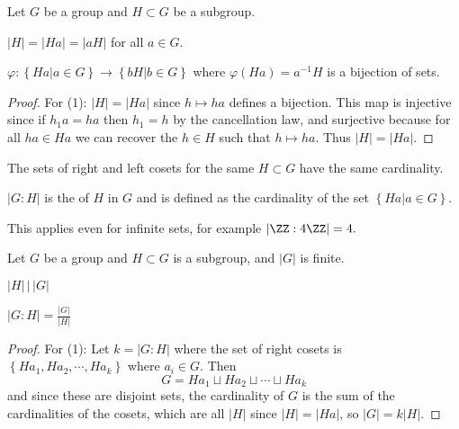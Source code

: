 \documentclass{article}
\begin{document}
\begin{lemma}
	Let $G$ be a group and $H\subset G$ be a subgroup.

	\begin{enumerate}[(1)]
		\ii $|H|=|Ha|=|aH|$ for all $a\in G.$

		\ii $\varphi:\left\{ Ha|a\in G \right\} \to \left\{ bH|b\in G \right\}$ where $\varphi(Ha)=a^{-1}H$ is a bijection of sets.
	\end{enumerate}
\end{lemma}

\begin{proof}
	For (1): $|H|=|Ha|$ since $h\mapsto ha$ defines a bijection. This map is injective since if $h_1a=ha$ then $h_1=h$ by the cancellation law, and surjective because for all $ha\in Ha$ we can recover the $h\in H$ such that $h\mapsto ha.$ Thus $|H|=|Ha|.$
\end{proof}

\begin{remark}
	The sets of right and left cosets for the same $H\subset G$ have the same cardinality.
\end{remark}

\begin{definition}
	$|G:H|$ is the  of $H$ in $G$ and is defined as the cardinality of the set $\left\{ Ha|a\in G \right\}.$
\end{definition}

\begin{remark}
	This applies even for infinite sets, for example $|\ZZ:4\ZZ|=4.$
\end{remark}

\begin{theorem}
	Let $G$ be a group and $H\subset G$ is a subgroup, and $|G|$ is finite.

	\begin{enumerate}[(1)]
		\ii $|H| \, \big\vert\, |G|$

		\ii $|G:H|=\displaystyle\frac{|G|}{|H|}$
	\end{enumerate}
\end{theorem}

\begin{proof}
	For (1): Let $k=|G:H|$ where the set of right cosets is $\left\{ Ha_1, Ha_2, \cdots, Ha_k \right\}$ where $a_i\in G.$ Then \[G=Ha_1\sqcup Ha_2\sqcup\cdots\sqcup Ha_k\] and since these are disjoint sets, the cardinality of $G$ is the sum of the cardinalities of the cosets, which are all $|H|$ since $|H|=|Ha|$, so $|G|=k|H|.$
\end{proof}
\end{document}
